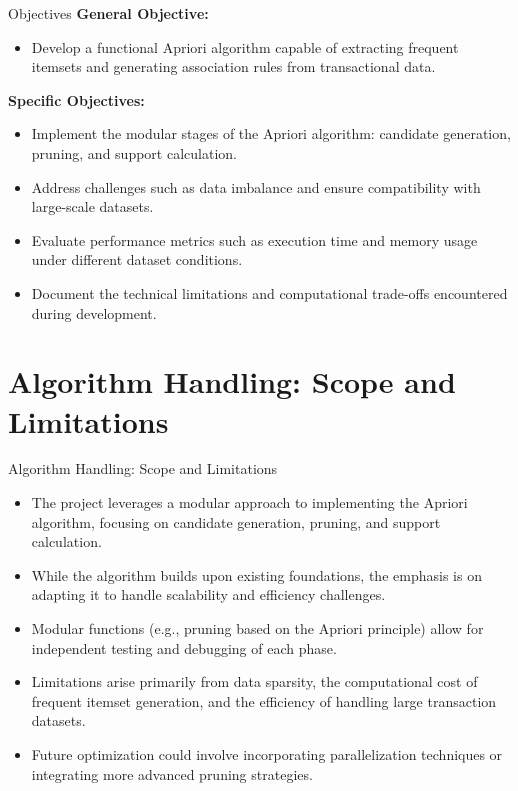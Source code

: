 \documentclass{beamer}
\begin{document}
\begin{frame}{Objectives}
    \textbf{General Objective:}
    \begin{itemize}
        \item Develop a functional Apriori algorithm capable of extracting frequent itemsets and generating association rules from transactional data.
    \end{itemize}

    \textbf{Specific Objectives:}
    \begin{itemize}
        \item Implement the modular stages of the Apriori algorithm: candidate generation, pruning, and support calculation.
        \item Address challenges such as data imbalance and ensure compatibility with large-scale datasets.
        \item Evaluate performance metrics such as execution time and memory usage under different dataset conditions.
        \item Document the technical limitations and computational trade-offs encountered during development.
    \end{itemize}
\end{frame}

\section{Algorithm Handling: Scope and Limitations}

\begin{frame}{Algorithm Handling: Scope and Limitations}
    \begin{itemize}
        \item The project leverages a modular approach to implementing the Apriori algorithm, focusing on candidate generation, pruning, and support calculation.
        \item While the algorithm builds upon existing foundations, the emphasis is on adapting it to handle scalability and efficiency challenges.
        \item Modular functions (e.g., pruning based on the Apriori principle) allow for independent testing and debugging of each phase.
        \item Limitations arise primarily from data sparsity, the computational cost of frequent itemset generation, and the efficiency of handling large transaction datasets.
        \item Future optimization could involve incorporating parallelization techniques or integrating more advanced pruning strategies.
    \end{itemize}
\end{frame}
\end{document}
